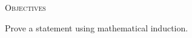 
\textsc{Objectives}
\begin{itemize}
  \li Prove a statement using mathematical induction.
\end{itemize}
